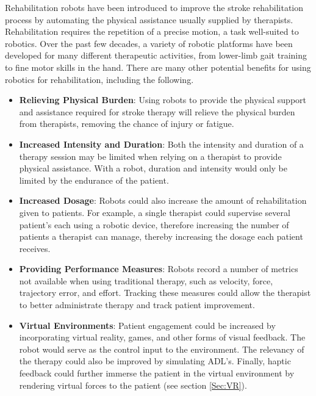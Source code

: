 \documentclass[12pt]{report}
\begin{document}
	Rehabilitation robots have been introduced to improve the stroke rehabilitation process by automating the physical assistance usually supplied by therapists. Rehabilitation requires the repetition of a precise motion, a task well-suited to robotics. Over the past few decades, a variety of robotic platforms have been developed for many different therapeutic activities, from lower-limb gait training to fine motor skills in the hand. There are many other potential benefits for using robotics for rehabilitation, including the following.
\begin{itemize}
	\item \textbf{Relieving Physical Burden}: Using robots to provide the physical support and assistance required for stroke therapy will relieve the physical burden from therapists, removing the chance of injury or fatigue.
	\item \textbf{Increased Intensity and Duration}: Both the intensity and duration of a therapy session may be limited when relying on a therapist to provide physical assistance. With a robot, duration and intensity would only be limited by the endurance of the patient. 
	\item \textbf{Increased Dosage}: Robots could also increase the amount of rehabilitation given to patients. For example, a single therapist could supervise several patient's each using a robotic device, therefore increasing the number of patients a therapist can manage, thereby increasing the dosage each patient receives.
	\item \textbf{Providing Performance Measures}: Robots record a number of metrics not available when using traditional therapy, such as velocity, force, trajectory error, and effort. Tracking these measures could allow the therapist to better administrate therapy and track patient improvement. 
	\item \textbf{Virtual Environments}: Patient engagement could be increased by incorporating virtual reality, games, and other forms of visual feedback. The robot would serve as the control input to the environment. The relevancy of the therapy could also be improved by simulating ADL's. Finally, haptic feedback could further immerse the patient in the virtual environment by rendering virtual forces to the patient (see section \ref{Sec:VR}).
\end{itemize}
	
\end{document}
